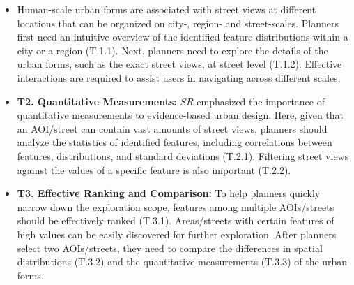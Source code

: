 \begin{itemize}

\item \textbf{}
Human-scale urban forms are associated with street views at different locations that can be organized on city-, region- and street-scales.
Planners first need an intuitive overview of the identified feature distributions within a city or a region (T.1.1).
Next, planners need to explore the details of the urban forms, such as the exact street views, at street level (T.1.2).
Effective interactions are required to assist users in navigating across different scales.

\vspace*{-1.5mm}
\item \textbf{T2. Quantitative Measurements:}
$SR$ emphasized the importance of quantitative measurements to evidence-based urban design.
Here, given that an AOI/street can contain vast amounts of street views, planners should analyze the statistics of identified features, including correlations between features, distributions, and standard deviations (T.2.1).
Filtering street views against the values of a specific feature is also important (T.2.2).

\vspace*{-1.5mm}
\item \textbf{T3. Effective Ranking and Comparison:}
To help planners quickly narrow down the exploration scope, features among multiple AOIs/streets should be effectively ranked (T.3.1).
Areas/streets with certain features of high values can be easily discovered for further exploration.
After planners select two AOIs/streets, they need to compare the differences in spatial distributions (T.3.2) and the quantitative measurements (T.3.3) of the urban forms. 

\end{itemize}